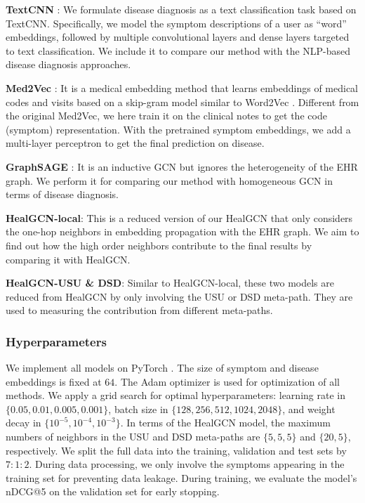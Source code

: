 \documentclass[sigconf]{acmart}
\begin{document}
\textbf{TextCNN} \cite{kim2014convolutional}: We formulate disease diagnosis as a text classification task based on TextCNN. Specifically, we model the symptom descriptions of a user as ``word'' embeddings, followed by multiple convolutional layers and dense layers targeted to text classification. We include it to compare our method with the NLP-based disease diagnosis approaches.

\textbf{Med2Vec} \cite{choi2016multi}: It is a medical embedding method that learns embeddings of medical codes and visits based on a skip-gram model similar to Word2Vec \cite{mikolov2013distributed}. Different from the original Med2Vec, we here train it on the clinical notes to get the code (symptom) representation. With the pretrained symptom embeddings, we add a multi-layer perceptron to get the final prediction on disease.

\textbf{GraphSAGE} \cite{hamilton2017inductive}: It is an inductive GCN but ignores the heterogeneity of the EHR graph. We perform it for comparing our method with homogeneous GCN in terms of disease diagnosis.

\textbf{HealGCN-local}: This is a reduced version of our HealGCN that only considers the one-hop neighbors in embedding propagation with the EHR graph. We aim to find out how the high order neighbors contribute to the final results by comparing it with HealGCN.

\textbf{HealGCN-USU \& DSD}: Similar to HealGCN-local, these two models are reduced from HealGCN by only involving the USU or DSD meta-path. They are used to measuring the contribution from different meta-paths.

\subsubsection{Hyperparameters}
We implement all models on PyTorch \cite{paszke2019pytorch}. The size of symptom and disease embeddings is fixed at $64$. The Adam optimizer \cite{kingma2014adam} is used for optimization of all methods. We apply a grid search for optimal hyperparameters: learning rate in $\{0.05, 0.01, 0.005,0.001\}$, batch size in $\{128,256,512,1024,2048\}$, and weight decay in $\{10^{-5},10^{-4},10^{-3}\}$. In terms of the HealGCN model, the maximum numbers of neighbors in the USU and DSD meta-paths are $\{5,5,5\}$ and $\{20,5\}$, respectively. We split the full data into the training, validation and test sets by $7:1:2$. During data processing, we only involve the symptoms appearing in the training set for preventing data leakage. During training, we evaluate the model's nDCG@5 on the validation set for early stopping.
\end{document}
